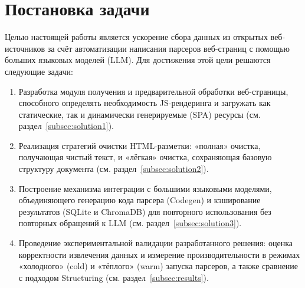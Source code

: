 
\section{Постановка задачи}
\label{sec:task}

Целью настоящей работы является ускорение сбора данных из открытых веб-источников за счёт автоматизации написания парсеров веб-страниц с помощью больших языковых моделей (LLM). Для достижения этой цели решаются следующие задачи:
\begin{enumerate}
    \item Разработка модуля получения и предварительной обработки веб-страницы, способного определять необходимость JS-рендеринга и загружать как статические, так и динамически генерируемые (SPA) ресурсы (см. раздел~\ref{subsec:solution1}).
    \item Реализация стратегий очистки HTML-разметки: «полная» очистка, получающая чистый текст, и «лёгкая» очистка, сохраняющая базовую структуру документа (см. раздел~\ref{subsec:solution2}).
    \item Построение механизма интеграции с большими языковыми моделями, объединяющего генерацию кода парсера (Codegen) и кэширование результатов (SQLite и ChromaDB) для повторного использования без повторных обращений к LLM (см. раздел~\ref{subsec:solution3}).
    \item Проведение экспериментальной валидации разработанного решения: оценка корректности извлечения данных и измерение производительности в режимах «холодного» (cold) и «тёплого» (warm) запуска парсеров, а также сравнение с подходом Structuring (см. раздел~\ref{subsec:results}).
\end{enumerate}
